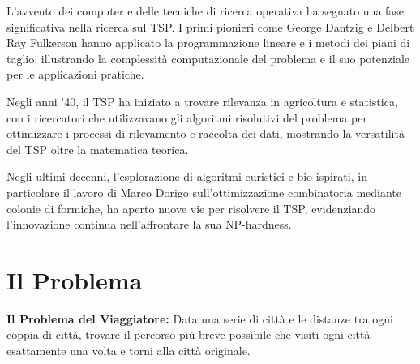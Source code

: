 L'avvento dei computer e delle tecniche di ricerca operativa ha segnato una fase significativa nella ricerca sul \Gls{TSP}. I primi pionieri come George Dantzig e Delbert Ray Fulkerson hanno applicato la programmazione lineare e i metodi dei piani di taglio, illustrando la complessità computazionale del problema e il suo potenziale per le applicazioni pratiche.

Negli anni '40, il \Gls{TSP} ha iniziato a trovare rilevanza in agricoltura e statistica, con i ricercatori che utilizzavano gli algoritmi risolutivi del problema per ottimizzare i processi di rilevamento e raccolta dei dati, mostrando la versatilità del \Gls{TSP} oltre la matematica teorica.

Negli ultimi decenni, l'esplorazione di algoritmi euristici e bio-ispirati, in particolare il lavoro di Marco Dorigo sull'ottimizzazione combinatoria mediante colonie di formiche, ha aperto nuove vie per risolvere il \Gls{TSP}, evidenziando l'innovazione continua nell'affrontare la sua NP-hardness.


\section{Il Problema}

\textbf{Il Problema del Viaggiatore:} Data una serie di città e le distanze tra ogni coppia di città, trovare il percorso più breve possibile che visiti ogni città esattamente una volta e torni alla città originale.



